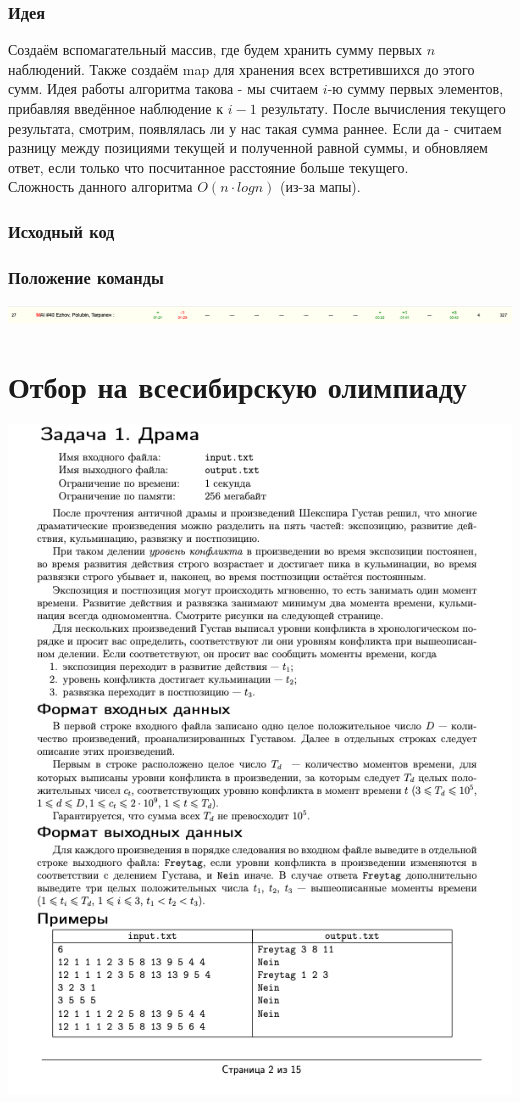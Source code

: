 \documentclass[12pt]{article}
\begin{document}
\subsubsection*{Идея}
Создаём вспомагательный массив, где будем хранить сумму первых $n$ наблюдений. Также создаём map для хранения всех встретившихся до этого сумм.
Идея работы алгоритма такова - мы считаем $i$-ю сумму первых элементов, прибавляя введённое наблюдение к $i-1$ результату. После вычисления текущего результата,
смотрим, появлялась ли у нас такая сумма раннее. Если да - считаем разницу между позициями текущей и полученной равной суммы, и обновляем ответ, если только что
посчитанное расстояние больше текущего.
\\ 
Сложность данного алгоритма $O(n \cdot log{n})$ (из-за мапы).
\subsubsection*{Исходный код}

\subsubsection*{Положение команды}
\includegraphics[scale=0.5]{images/9.png}\newline\noindent

\pagebreak
\section{Отбор на всесибирскую олимпиаду}
\includegraphics[scale=0.75]{statements/Vsesib.png}
\end{document}
